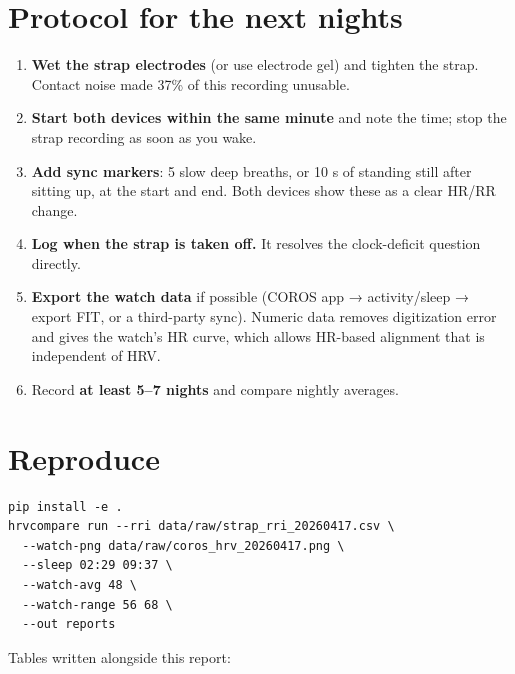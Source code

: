 \documentclass[11pt,a4paper]{article}
\begin{document}
\section{Protocol for the next nights}\label{sec:protocol-for-the-next-nights}
\begin{enumerate}
\item \textbf{Wet the strap electrodes} (or use electrode gel) and tighten the strap. Contact noise made 37\% of this recording unusable.
\item \textbf{Start both devices within the same minute} and note the time; stop the strap recording as soon as you wake.
\item \textbf{Add sync markers}: 5 slow deep breaths, or 10 s of standing still after sitting up, at the start and end. Both devices show these as a clear HR/RR change.
\item \textbf{Log when the strap is taken off.} It resolves the clock-deficit question directly.
\item \textbf{Export the watch data} if possible (COROS app → activity/sleep → export FIT, or a third-party sync). Numeric data removes digitization error and gives the watch's HR curve, which allows HR-based alignment that is independent of HRV.
\item Record \textbf{at least 5–7 nights} and compare nightly averages.
\end{enumerate}
\section*{Reproduce}\label{sec:reproduce}
\begin{codebox}
\begin{Verbatim}
pip install -e .
hrvcompare run --rri data/raw/strap_rri_20260417.csv \
  --watch-png data/raw/coros_hrv_20260417.png \
  --sleep 02:29 09:37 \
  --watch-avg 48 \
  --watch-range 56 68 \
  --out reports
\end{Verbatim}
\end{codebox}
Tables written alongside this report:
\end{document}
